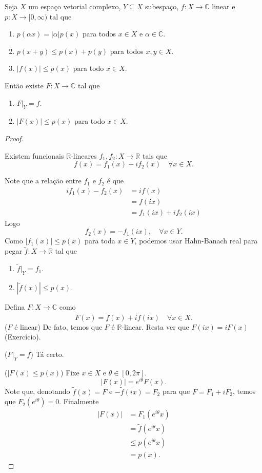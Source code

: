 \documentclass[portuguese]{article}
\theoremstyle{definition}
\newcommand{\R}{\mathbb{R}}
\newcommand{\C}{\mathbb{C}}
\begin{document}
	\begin{teo}
		Seja $X$ um espaço vetorial complexo, $Y\subseteq X$ subespaço, $f:X\to\C$ linear e $p:X\to[0,\infty)$ tal que
		\begin{enumerate}
			\item $p(\alpha x)=|\alpha|p(x)$ para todos $x\in X$ e $\alpha\in\C$.
			\item $p(x+y)\leq p(x)+p(y)$ para todos $x,y\in X$.
			\item $|f(x)|\leq p(x)$ para todo $x\in X$.
		\end{enumerate}
		Então existe $F:X\to\C$ tal que
		\begin{enumerate}
			\item $F|_Y=f$.
			\item $|F(x)|\leq p(x)$ para todo $x\in X$.
		\end{enumerate}
	\end{teo}
	\begin{proof}
		\begin{exer*}
			Existem funcionais $\R$-lineares $f_1,f_2:X\to\R$ tais que
			\[f(x)=f_1(x)+if_2(x)\quad\forall x\in X.\]
		\end{exer*}
		Note que a relação entre $f_1$ e $f_2$ é que
		\begin{align*}
			i f_1(x)-f_2(x)&=i f(x)\\
			&=f(ix)\\
			&=f_1(ix)+if_2(ix)
		\end{align*}
		Logo
		\[f_2(x)=-f_1(ix),\quad\forall x\in Y.\]
		Como $|f_1(x)|\leq p(x)$ para toda $x\in Y$, podemos usar Hahn-Banach real para pegar $\tilde{f}:X\to\R$ tal que
		\begin{enumerate}
			\item $\tilde{f}|_Y=f_1$.
			\item $|\tilde{f}(x)|\leq p(x)$.
		\end{enumerate}
		Defina $F:X\to\C$ como 
		\[F(x)=\tilde{f}(x)+i\tilde{f}(ix)\quad\forall x\in X.\]
		($F$ é linear) De fato, temos que $F$ é $\R$-linear. Resta ver que $F(ix)=iF(x)$ (Exercício).
		
		($F|_Y=f$) Tá certo.
		
		($|F(x)\leq p(x)$) Fixe $x\in X$ e $\theta\in[0,2\pi]$.
		\[|F(x)|=e^{i\theta}F(x).\]
		Note que, denotando $\tilde{f}(x)=F$ e $-\tilde{f}(ix)=F_2$ para que $F=F_1+iF_2$, temos que $F_2(e^{i\theta})=0$. Finalmente
		\begin{align*}
			|F(x)|&=F_1(e^{i\theta}x)\\
			&=\tilde{f}(e^{i\theta}x)\\
			&\leq p(e^{i\theta}x)\\
			&=p(x).
		\end{align*}
	\end{proof}
	
\end{document}
